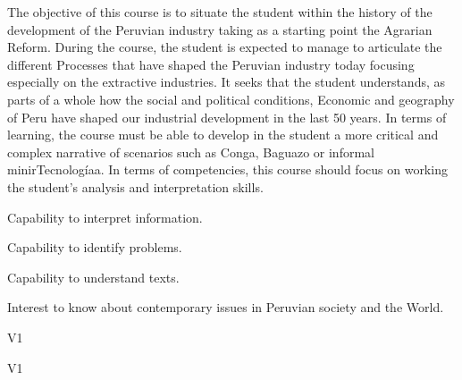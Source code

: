 \begin{syllabus}


\begin{justification}
The objective of this course is to situate the student within the history of the development of the Peruvian industry taking as a starting point the Agrarian Reform. During the course, the student is expected to manage to articulate the different
Processes that have shaped the Peruvian industry today focusing especially on the extractive industries. It seeks that the student understands, as parts of a whole how the social and political conditions,
Economic and geography of Peru have shaped our industrial development in the last 50 years. In terms of learning, the course must be able to develop in the student a more critical and complex narrative of scenarios such as Conga, Baguazo or informal minirTecnologíaa. In terms of competencies, this course should focus on working the student's analysis and interpretation skills.
\end{justification}

\begin{goals}
\item Capability to interpret information.
\item Capability to identify problems.
\item Capability to understand texts.
\item Interest to know about contemporary issues in Peruvian society and the World.
\end{goals}

\begin{outcomes}{V1}
    \item {} 
    \item {} 
    \item {} 
    \item {} 
    \item {} 
\end{outcomes}

\begin{competences}{V1}
    \item {}
    \item {}
    \item {}
    \item {}
\end{competences}


\end{syllabus}
